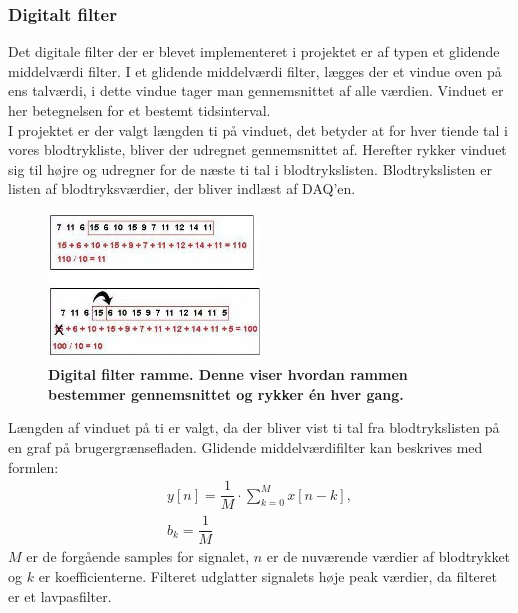 \subsubsection{Digitalt filter}
Det digitale filter der er blevet implementeret i projektet er af typen et glidende middelværdi filter. I et glidende middelværdi filter, lægges der et vindue oven på ens talværdi, i dette vindue tager man gennemsnittet af alle værdien. \cite{digifilter} Vinduet er her betegnelsen for et bestemt tidsinterval. \\
I projektet er der valgt længden ti på vinduet, det betyder at for hver tiende tal i vores blodtrykliste, bliver der udregnet gennemsnittet af. Herefter rykker vinduet sig til højre og udregner for de næste ti tal i blodtrykslisten. Blodtrykslisten er listen af blodtryksværdier, der bliver indlæst af DAQ’en. 
\begin{figure}[H]
\includegraphics[width =0.5\textwidth , center]{billeder/RammeDigi}
\caption{\textbf{Digital filter ramme. Denne viser hvordan rammen bestemmer gennemsnittet og rykker én hver gang.}}
\end{figure}
Længden af vinduet på ti er valgt, da der bliver vist ti tal fra blodtrykslisten på en graf på brugergrænsefladen. 
Glidende middelværdifilter kan beskrives med formlen:
\begin{align}
y\left[n\right] = \dfrac{1}{M}\cdot \sum_{k=0}^{M}x\left[n-k\right],\\ b_{k}=\dfrac{1}{M}
\end{align}
$M$ er de forgående samples for signalet, $n$ er de nuværende værdier af blodtrykket og $k$ er koefficienterne. 
Filteret udglatter signalets høje peak værdier, da filteret er et lavpasfilter.
